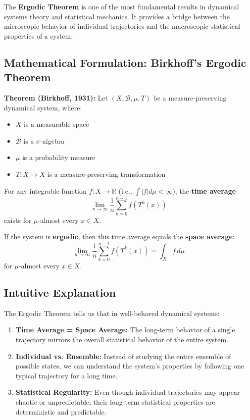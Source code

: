\documentclass[12pt,a4paper]{article}
\begin{document}
The \textbf{Ergodic Theorem} is one of the most fundamental results in dynamical systems theory and statistical mechanics. It provides a bridge between the microscopic behavior of individual trajectories and the macroscopic statistical properties of a system.

\subsection{Mathematical Formulation: Birkhoff's Ergodic Theorem}

\textbf{Theorem (Birkhoff, 1931):} Let $(X, \mathcal{B}, \mu, T)$ be a measure-preserving dynamical system, where:
\begin{itemize}
    \item $X$ is a measurable space
    \item $\mathcal{B}$ is a $\sigma$-algebra
    \item $\mu$ is a probability measure
    \item $T: X \to X$ is a measure-preserving transformation
\end{itemize}

For any integrable function $f: X \to \mathbb{R}$ (i.e., $\int |f| d\mu < \infty$), the \textbf{time average}
\[
\lim_{n \to \infty} \frac{1}{n} \sum_{k=0}^{n-1} f(T^k(x))
\]
exists for $\mu$-almost every $x \in X$.

If the system is \textbf{ergodic}, then this time average equals the \textbf{space average}:
\[
\lim_{n \to \infty} \frac{1}{n} \sum_{k=0}^{n-1} f(T^k(x)) = \int_X f \, d\mu
\]
for $\mu$-almost every $x \in X$.

\subsection{Intuitive Explanation}

The Ergodic Theorem tells us that in well-behaved dynamical systems:

\begin{enumerate}
    \item \textbf{Time Average = Space Average:} The long-term behavior of a single trajectory mirrors the overall statistical behavior of the entire system.
    \item \textbf{Individual vs. Ensemble:} Instead of studying the entire ensemble of possible states, we can understand the system's properties by following one typical trajectory for a long time.
    \item \textbf{Statistical Regularity:} Even though individual trajectories may appear chaotic or unpredictable, their long-term statistical properties are deterministic and predictable.
\end{enumerate}
\end{document}
